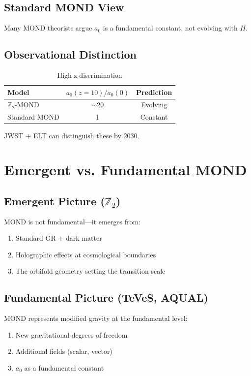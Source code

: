 \documentclass[12pt,a4paper]{article}
\begin{document}
\subsection{Standard MOND View}

Many MOND theorists argue $a_0$ is a fundamental constant, not evolving with $H$.

\subsection{Observational Distinction}

\begin{table}[h]
\centering
\begin{tabular}{lcc}
\toprule
Model & $a_0(z=10)/a_0(0)$ & Prediction \\
\midrule
$\mathbb{Z}_2$-MOND & $\sim 20$ & Evolving \\
Standard MOND & 1 & Constant \\
\bottomrule
\end{tabular}
\caption{High-z discrimination}
\end{table}

JWST + ELT can distinguish these by 2030.

\section{Emergent vs. Fundamental MOND}

\subsection{Emergent Picture ($\mathbb{Z}_2$)}

MOND is not fundamental---it emerges from:
\begin{enumerate}
    \item Standard GR + dark matter
    \item Holographic effects at cosmological boundaries
    \item The orbifold geometry setting the transition scale
\end{enumerate}

\subsection{Fundamental Picture (TeVeS, AQUAL)}

MOND represents modified gravity at the fundamental level:
\begin{enumerate}
    \item New gravitational degrees of freedom
    \item Additional fields (scalar, vector)
    \item $a_0$ as a fundamental constant
\end{enumerate}
\end{document}
